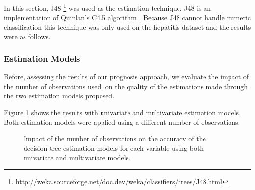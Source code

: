 In this section, J48 \footnote{http://weka.sourceforge.net/doc.dev/weka/classifiers/trees/J48.html} was used as the estimation technique. J48 is an implementation of Quinlan's C4.5 algorithm \cite{Quinlan1993}. Because J48 cannot handle numeric classification this technique was only used on the hepatitis dataset and the results were as follows.

\subsubsection{Estimation Models}
\label{subsubsection:estimation_dt}

Before, assessing the results of our prognosis approach, we evaluate the impact of the number of observations used, on the 
quality of the estimations made through the two estimation models proposed.

Figure \ref{fig:estimationtreeh} shows the results with univariate and multivariate estimation models. Both estimation models were
 applied using a different number of observations. 
 
\begin{figure}[h]
  \begin{subfigmatrix}{2}
  \end{subfigmatrix}
  \caption{Impact of the number of observations on the accuracy of the decision tree estimation models for each variable using both univariate and multivariate models.}
  \label{fig:estimationtreeh}
\end{figure}
 
